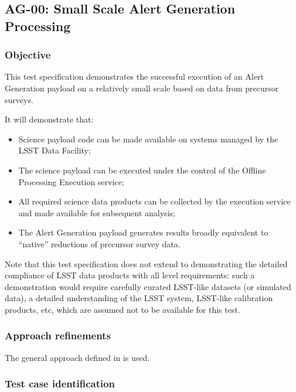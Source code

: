 \subsection{AG-00: Small Scale Alert Generation Processing}
\label{ag-00}

\subsubsection{Objective}

This test specification demonstrates the successful execution of an
Alert Generation payload on a relatively small scale based on data from
precursor surveys.

It will demonstrate that:

\begin{itemize}

  \item{Science payload code can be made available on systems managed by the
  LSST Data Facility;}

  \item{The science payload can be executed under the
  control of the Offline Processing Execution service;}

  \item{All required science data products can be collected by the execution
  service and made available for subsequent analysis;}

  \item{The Alert Generation payload generates results broadly
  equivalent to ``native'' reductions of precursor survey data.}

\end{itemize}

Note that this test specification does not extend to demonstrating the
detailed compliance of LSST data products with all  level requirements: such a demonstration would
require carefully curated LSST-like datasets (or simulated data), a detailed
understanding of the LSST system, LSST-like calibration products, etc, which
are assumed not to be available for this test.

\subsubsection{Approach refinements}

The general approach defined in  is used.

\subsubsection{Test case identification}

